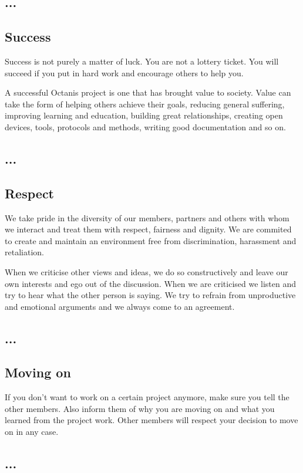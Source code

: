 \french
	\subsection{...}


\english
	\subsection{Success}
	
	Success is not purely a matter of luck. You are not a lottery ticket. You will succeed if you put in hard work and encourage others to help you. 


	A successful Octanis project is one that has brought value to society. Value can take the form of helping others achieve their goals, reducing general suffering, improving learning and education, building great relationships, creating open devices, tools, protocols and methods, writing good documentation and so on.


\french
	\subsection{...}


\english
	\subsection{Respect}
 	We take pride in the diversity of our members, partners and others with whom we interact and treat them with respect, fairness and dignity. We are commited to create and maintain an environment free from discrimination, harassment and retaliation. 

 	When we criticise other views and ideas, we do so constructively and leave our own interests and ego out of the discussion. 
 	When we are criticised we listen and try to hear what the other person is saying. 
 	We try to refrain from unproductive and emotional arguments and we always come to an agreement.


\french
	\subsection{...}


\english
	\subsection{Moving on}
	If you don't want to work on a certain project anymore, make sure you tell the other members. Also inform them of why you are moving on and what you learned from the project work. Other members will respect your decision to move on in any case.

\french
	\subsection{...}


